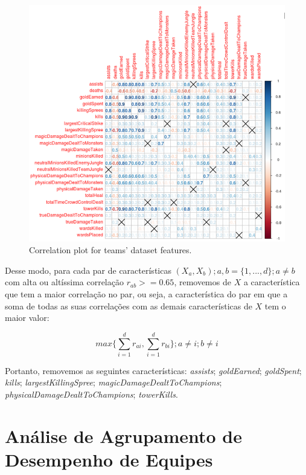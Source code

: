 \begin{figure}
  \centering
  \includegraphics[width=1.0\textwidth]{correlations}%
  \caption{Correlation plot for teams' dataset features.}
  \label{fig:correlations}
\end{figure}

Desse modo, para cada par de características $(X_a, X_b); a, b=\{1, ..., d\};a \neq b$ com alta ou altíssima correlação $r_{ab} >= 0.65$, removemos de $X$ a característica que tem a maior correlação no par, ou seja, a característica do par em que a soma de todas as suas correlações com as demais características de $X$ tem o maior valor:

\begin{displaymath}
  max \big\{ \sum_{i=1}^{d} r_{ai} ,  \sum_{i=1}^{d} r_{bi} \big\}; a \neq i; b \neq i
\end{displaymath}

Portanto, removemos as seguintes características: \textit{assists}; \textit{goldEarned}; \textit{goldSpent}; \textit{kills}; \textit{largestKillingSpree}; \textit{magicDamageDealtToChampions}; \textit{physicalDamageDealtToChampions}; \textit{towerKills}.

\chapter{Análise de Agrupamento de Desempenho de Equipes}

